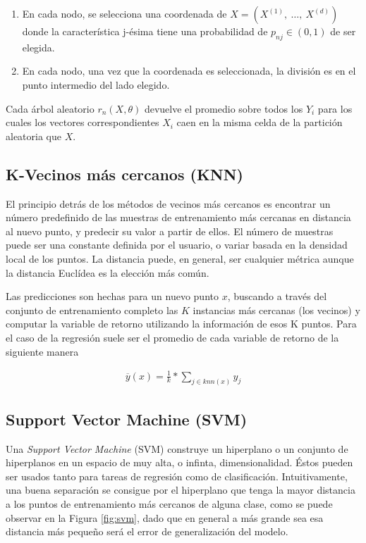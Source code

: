       \begin{enumerate}
        \item En cada nodo, se selecciona una coordenada de $X = (X^{(1)}, \ \dots,\ X^{(d)})$
              donde la característica j-ésima tiene una probabilidad de $p_{nj} \in (0,1)$
              de ser elegida.
        \item En cada nodo, una vez que la coordenada es seleccionada, la división es
              en el punto intermedio del lado elegido.
      \end{enumerate}

      Cada árbol aleatorio $r_{n}(X, \theta)$ devuelve el promedio sobre todos los
      $Y_{i}$ para los cuales los vectores correspondientes $X_{i}$ caen en la misma
      celda de la partición aleatoria que $X$.


  \subsection{K-Vecinos más cercanos (KNN)}
    \par El principio detrás de los métodos de vecinos más cercanos es encontrar un
      número predefinido de las muestras de entrenamiento más cercanas en distancia
      al nuevo punto, y predecir su valor a partir de ellos.
      El número de muestras puede ser una constante definida por el usuario, o
      variar basada en la densidad local de los puntos. La distancia puede, en general,
      ser cualquier métrica aunque la distancia Euclídea es la elección más común.

    \par Las predicciones son hechas para un nuevo punto $x$, buscando a través del conjunto
      de entrenamiento completo las $K$ instancias más cercanas (los vecinos) y computar
      la variable de retorno utilizando la información de esos K puntos. Para el caso
      de la regresión suele ser el promedio de cada variable de retorno de la siguiente
      manera

      \begin{align}
        \overline{y}(x) = \frac{1}{k} * \sum_{j \in knn(x)} y_{j}
      \end{align}



  \subsection{Support Vector Machine (SVM)}

    \par Una \textit{Support Vector Machine} (SVM) \cite{first_svm} construye un
      hiperplano o un conjunto de hiperplanos en un espacio
      de muy alta, o infinta, dimensionalidad. Éstos pueden ser usados tanto para
      tareas de regresión como de clasificación. Intuitivamente, una buena separación
      se consigue por el hiperplano que tenga la mayor distancia a los puntos de
      entrenamiento más cercanos de alguna clase, como se puede observar en la
      Figura \ref{fig:svm}, dado que en general
      a más grande sea esa distancia más pequeño será el error de generalización del
      modelo.

